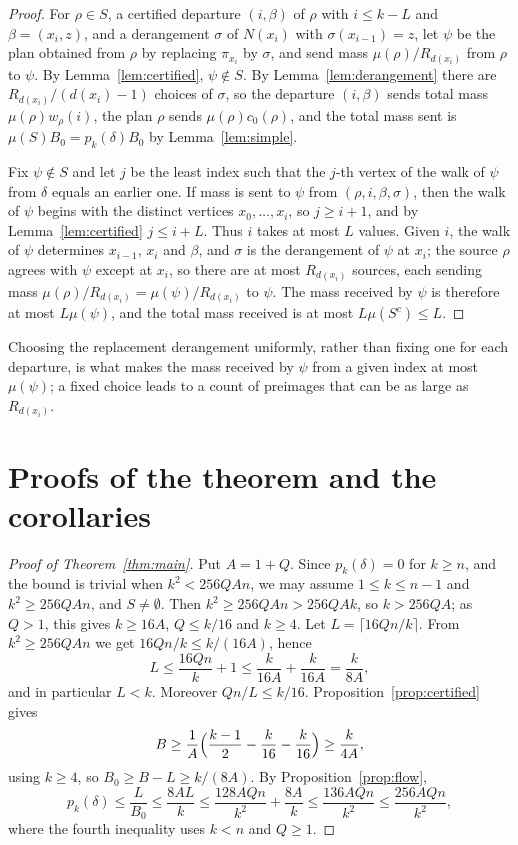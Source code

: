 \documentclass[11pt]{amsart}
\theoremstyle{remark}
\begin{document}
\begin{proof}
For $\rho\in S$, a certified departure $(i,\beta)$ of $\rho$ with $i\le k-L$ and $\beta=(x_i,z)$, and a derangement
$\sigma$ of $N(x_i)$ with $\sigma(x_{i-1})=z$, let $\psi$ be the plan obtained from $\rho$ by replacing $\pi_{x_i}$ by
$\sigma$, and send mass $\mu(\rho)/R_{d(x_i)}$ from $\rho$ to $\psi$. By Lemma~\ref{lem:certified}, $\psi\notin S$. By
Lemma~\ref{lem:derangement} there are $R_{d(x_i)}/(d(x_i)-1)$ choices of $\sigma$, so the departure $(i,\beta)$ sends
total mass $\mu(\rho)w_\rho(i)$, the plan $\rho$ sends $\mu(\rho)c_0(\rho)$, and the total mass sent is
$\mu(S)B_0=p_k(\delta)B_0$ by Lemma~\ref{lem:simple}.

Fix $\psi\notin S$ and let $j$ be the least index such that the $j$-th vertex of the walk of $\psi$ from $\delta$ equals
an earlier one. If mass is sent to $\psi$ from $(\rho,i,\beta,\sigma)$, then the walk of $\psi$ begins with the distinct
vertices $x_0,\dots,x_i$, so $j\ge i+1$, and by Lemma~\ref{lem:certified} $j\le i+L$. Thus $i$ takes at most $L$
values. Given $i$, the walk of $\psi$ determines $x_{i-1}$, $x_i$ and $\beta$, and $\sigma$ is the derangement of $\psi$
at $x_i$; the source $\rho$ agrees with $\psi$ except at $x_i$, so there are at most $R_{d(x_i)}$ sources, each sending
mass $\mu(\rho)/R_{d(x_i)}=\mu(\psi)/R_{d(x_i)}$ to $\psi$. The mass received by $\psi$ is therefore at most
$L\mu(\psi)$, and the total mass received is at most $L\mu(S^c)\le L$.
\end{proof}

Choosing the replacement derangement uniformly, rather than fixing one for each departure, is what makes the mass
received by $\psi$ from a given index at most $\mu(\psi)$; a fixed choice leads to a count of preimages that can be as
large as $R_{d(x_i)}$.

\section{Proofs of the theorem and the corollaries}\label{sec:proofs}

\begin{proof}[Proof of Theorem~\ref{thm:main}]
Put $A=1+Q$. Since $p_k(\delta)=0$ for $k\ge n$, and the bound is trivial when $k^2<256QAn$, we may assume
$1\le k\le n-1$ and $k^2\ge256QAn$, and $S\ne\emptyset$. Then $k^2\ge256QAn>256QAk$, so $k>256QA$; as $Q>1$, this gives
$k\ge16A$, $Q\le k/16$ and $k\ge4$. Let $L=\lceil16Qn/k\rceil$. From $k^2\ge256QAn$ we get $16Qn/k\le k/(16A)$, hence
\[
L\le\frac{16Qn}k+1\le\frac k{16A}+\frac k{16A}=\frac k{8A},
\]
and in particular $L<k$. Moreover $Qn/L\le k/16$. Proposition~\ref{prop:certified} gives
\[
B\ge\frac1A\Bigl(\frac{k-1}2-\frac k{16}-\frac k{16}\Bigr)\ge\frac k{4A},
\]
using $k\ge4$, so $B_0\ge B-L\ge k/(8A)$. By Proposition~\ref{prop:flow},
\[
p_k(\delta)\le\frac{L}{B_0}\le\frac{8AL}k\le\frac{128AQn}{k^2}+\frac{8A}k\le\frac{136AQn}{k^2}\le\frac{256AQn}{k^2},
\]
where the fourth inequality uses $k<n$ and $Q\ge1$.
\end{proof}
\end{document}
